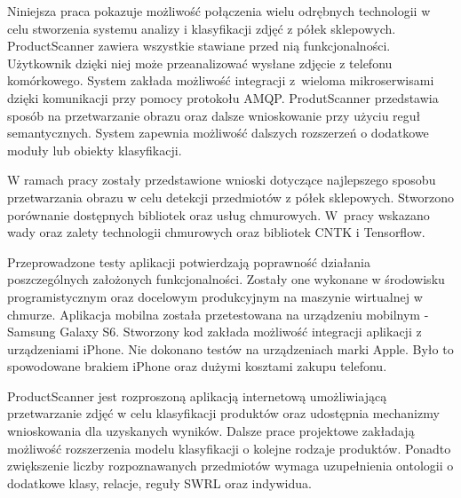 Niniejsza praca pokazuje możliwość połączenia wielu odrębnych technologii w celu stworzenia systemu analizy i klasyfikacji zdjęć z półek sklepowych. ProductScanner zawiera wszystkie stawiane przed nią funkcjonalności. Użytkownik dzięki niej może przeanalizować wysłane zdjęcie z telefonu komórkowego. System zakłada możliwość integracji z~wieloma mikroserwisami dzięki komunikacji przy pomocy protokołu AMQP. ProdutScanner przedstawia sposób na przetwarzanie obrazu oraz dalsze wnioskowanie przy użyciu reguł semantycznych. System zapewnia możliwość dalszych rozszerzeń o dodatkowe moduły lub obiekty klasyfikacji. 

W ramach pracy zostały przedstawione wnioski dotyczące najlepszego sposobu przetwarzania obrazu w celu detekcji przedmiotów z półek sklepowych. Stworzono porównanie dostępnych bibliotek oraz usług chmurowych. W~pracy wskazano wady oraz zalety technologii chmurowych oraz bibliotek CNTK i Tensorflow. 

Przeprowadzone testy aplikacji potwierdzają poprawność działania poszczególnych założonych funkcjonalności. Zostały one wykonane w środowisku programistycznym oraz docelowym produkcyjnym na maszynie wirtualnej w chmurze. Aplikacja mobilna została przetestowana na urządzeniu mobilnym - Samsung Galaxy S6. Stworzony kod zakłada możliwość integracji aplikacji z urządzeniami iPhone. Nie dokonano testów na urządzeniach marki Apple. Było to spowodowane brakiem iPhone oraz dużymi kosztami zakupu telefonu.

ProductScanner jest rozproszoną aplikacją internetową umożliwiającą przetwarzanie zdjęć w celu klasyfikacji produktów oraz udostępnia mechanizmy wnioskowania dla uzyskanych wyników. Dalsze prace projektowe zakładają możliwość rozszerzenia modelu klasyfikacji o kolejne rodzaje produktów. Ponadto zwiększenie liczby rozpoznawanych przedmiotów wymaga uzupełnienia ontologii o dodatkowe klasy, relacje, reguły SWRL oraz indywidua.